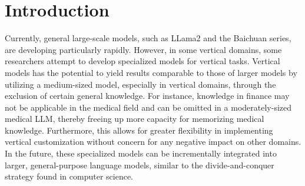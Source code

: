 \documentclass{article} %
\begin{document}



\maketitle


\section{Introduction}

Currently, general large-scale models, such as LLama2 and the Baichuan series, are developing particularly rapidly. However, in some vertical domains, some researchers  attempt to develop specialized models for vertical tasks. Vertical models has the potential to yield results comparable to those of larger models by utilizing a medium-sized model, especially in vertical domains, through the exclusion of certain general knowledge. For instance, knowledge in finance may not be applicable in the medical field and can be omitted in a moderately-sized medical LLM, thereby freeing up more capacity for memorizing medical knowledge. Furthermore, this allows for greater flexibility in implementing vertical customization without concern for any negative impact on other domains.  In the future, these specialized models can be incrementally integrated into larger, general-purpose language models, similar to the divide-and-conquer strategy found in computer science.
\end{document}
